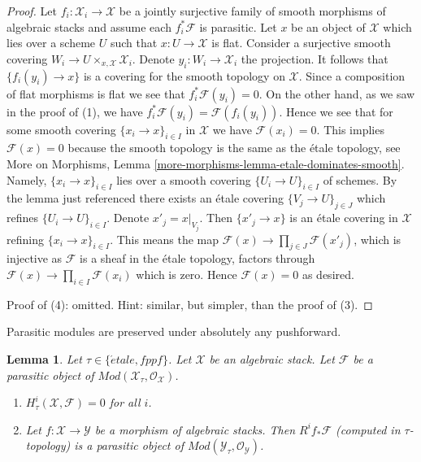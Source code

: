 \documentclass{stacks-project}
\theoremstyle{plain}
\newtheorem{lemma}[subsection]{Lemma}
\theoremstyle{definition}
\theoremstyle{remark}
\numberwithin{equation}{subsection}
\def\etale{{\acute{e}tale}}
\begin{document}
\begin{proof}
\medskip\noindent
Let $f_i : \mathcal{X}_i \to \mathcal{X}$ be a jointly surjective family of
smooth morphisms of algebraic stacks and assume each $f_i^*\mathcal{F}$
is parasitic. Let $x$ be an object of $\mathcal{X}$ which lies over a
scheme $U$ such that $x : U \to \mathcal{X}$ is flat. Consider a surjective
smooth covering $W_i \to U \times_{x, \mathcal{X}} \mathcal{X}_i$.
Denote $y_i : W_i \to \mathcal{X}_i$ the projection. It follows
that $\{f_i(y_i) \to x\}$ is a covering for the smooth topology
on $\mathcal{X}$. Since a composition of flat morphisms is flat we see that
$f_i^*\mathcal{F}(y_i) = 0$. On the other hand, as we saw in the proof
of (1), we have $f_i^*\mathcal{F}(y_i) = \mathcal{F}(f_i(y_i))$.
Hence we see that for some smooth covering $\{x_i \to x\}_{i \in I}$
in $\mathcal{X}$ we have $\mathcal{F}(x_i) = 0$. This implies
$\mathcal{F}(x) = 0$ because the smooth topology is the same
as the \'etale topology, see
More on Morphisms, Lemma \ref{more-morphisms-lemma-etale-dominates-smooth}.
Namely, $\{x_i \to x\}_{i \in I}$ lies over a smooth covering
$\{U_i \to U\}_{i \in I}$ of schemes. By the lemma just referenced
there exists an \'etale covering $\{V_j \to U\}_{j \in J}$ which
refines $\{U_i \to U\}_{i \in I}$. Denote $x'_j = x|_{V_j}$.
Then $\{x'_j \to x\}$ is an \'etale covering in $\mathcal{X}$
refining $\{x_i \to x\}_{i \in I}$. This means the map
$\mathcal{F}(x) \to \prod_{j \in J} \mathcal{F}(x'_j)$, which is
injective as $\mathcal{F}$ is a sheaf in the \'etale topology,
factors through $\mathcal{F}(x) \to \prod_{i \in I} \mathcal{F}(x_i)$
which is zero. Hence $\mathcal{F}(x) = 0$ as desired.

\medskip\noindent
Proof of (4): omitted. Hint: similar, but simpler, than the proof of (3).
\end{proof}

\noindent
Parasitic modules are preserved under absolutely any pushforward.

\begin{lemma}
\label{lemma-pushforward-parasitic}
Let $\tau \in \{\etale, fppf\}$.
Let $\mathcal{X}$ be an algebraic stack.
Let $\mathcal{F}$ be a parasitic object of
$\textit{Mod}(\mathcal{X}_\tau, \mathcal{O}_\mathcal{X})$.
\begin{enumerate}
\item $H^i_\tau(\mathcal{X}, \mathcal{F}) = 0$ for all $i$.
\item Let $f : \mathcal{X} \to \mathcal{Y}$ be a morphism of algebraic stacks.
Then $R^if_*\mathcal{F}$ (computed in $\tau$-topology) is a
parasitic object of $\textit{Mod}(\mathcal{Y}_\tau, \mathcal{O}_\mathcal{Y})$.
\end{enumerate}
\end{lemma}
\end{document}
